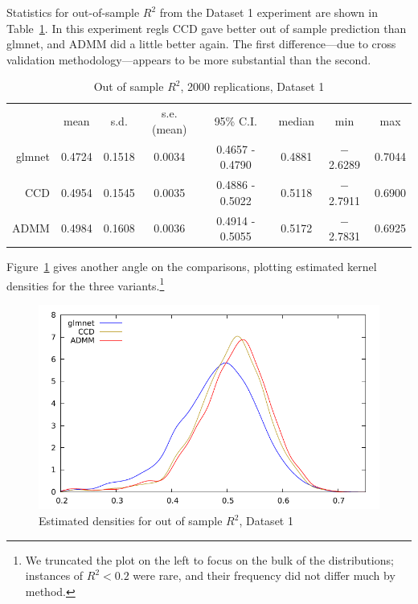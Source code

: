\documentclass{article}
\begin{document}

Statistics for out-of-sample $R^2$ from the Dataset 1 experiment are
shown in Table~\ref{tab:dset1}. In this experiment \textsf{regls} CCD
gave better out of sample prediction than \textsf{glmnet}, and ADMM
did a little better again. The first difference---due to cross
validation methodology---appears to be more substantial than the
second.

\begin{table}[htbp]
  \centering
  \begin{tabular}{rccccccc}
 & mean & s.d. & s.e.(mean) & 95\% C.I. & median & min & max \\
      glmnet & 0.4724 & 0.1518 & 0.0034 & 0.4657 - 0.4790 & 0.4881 & $-$2.6289 & 0.7044 \\
        CCD & 0.4954 & 0.1545 & 0.0035 & 0.4886 - 0.5022 & 0.5118 & $-$2.7911 & 0.6900 \\
       ADMM & 0.4984 & 0.1608 & 0.0036 & 0.4914 - 0.5055 & 0.5172 & $-$2.7831 & 0.6925 \\
  \end{tabular}
  \caption{Out of sample $R^2$, 2000 replications, Dataset 1}
  \label{tab:dset1}
\end{table}

Figure~\ref{fig:dset1} gives another angle on the comparisons,
plotting estimated kernel densities for the three
variants.\footnote{We truncated the plot on the left to focus on the
  bulk of the distributions; instances of $R^2 < 0.2$ were rare, and
  their frequency did not differ much by method.}

\begin{figure}[htbp]
  \centering
  \includegraphics[scale=0.9]{murder_kd3.pdf} 
  \caption{Estimated densities for out of sample $R^2$, Dataset 1}
  \label{fig:dset1}
\end{figure}
\end{document}
